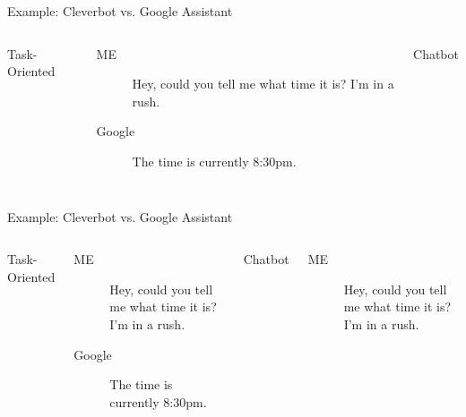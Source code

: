 \documentclass[10pt]{beamer}
\begin{document}
\begin{frame}{Example: Cleverbot vs. Google Assistant}

    \begin{columns}[T,onlytextwidth]


      Task-Oriented

      \begin{description}

        \item[ME] Hey, could you tell me what time it is? I'm in a rush. \item[Google] The time is currently 8:30pm.

      \end{description}

 


      Chatbot

  \end{columns}

\end{frame}

 

\begin{frame}{Example: Cleverbot vs. Google Assistant}

    \begin{columns}[T,onlytextwidth]


      Task-Oriented

      \begin{description}

        \item[ME] Hey, could you tell me what time it is? I'm in a rush. \item[Google] The time is currently 8:30pm.

      \end{description}

 


      Chatbot

      \begin{description}

        \item[ME] Hey, could you tell me what time it is? I'm in a rush.

      \end{description}

  \end{columns}

\end{frame}
\end{document}

